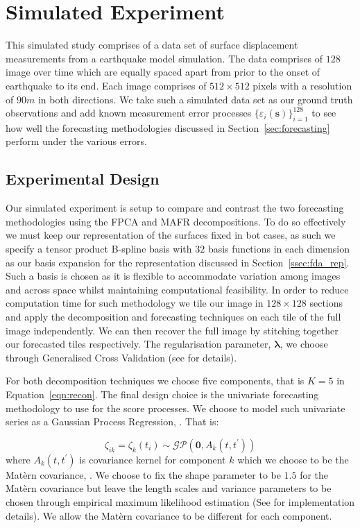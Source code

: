 \documentclass{article}
\newcommand{\ve}[1]{\bm{{#1}}}
\begin{document}
\section{\label{sec:sim_exp}Simulated Experiment}
This simulated study comprises of a data set of surface displacement measurements from a earthquake model simulation. The data comprises of $128$ image over time which are equally spaced apart from prior to the onset of earthquake to its end. Each image comprises of $512 \times 512$ pixels with a resolution of $90m$ in both directions. We take such a simulated data set as our ground truth observations and add known measurement error processes $\{\varepsilon_i\left( \ve{s} \right)\}_{i=1}^{128}$ to see how well the forecasting methodologies discussed in Section~\ref{sec:forecasting} perform under the various errors. 
\subsection{\label{ssec:sim_exp_design}Experimental Design}
Our simulated experiment is setup to compare and contrast the two forecasting methodologies using the FPCA and MAFR decompositions. To do so effectively we must keep our representation of the surfaces fixed in bot cases, as such we specify a tensor product B-spline basis with $32$ basis functions in each dimension as our basis expansion for the representation discussed in Section~\ref{ssec:fda_rep}. Such a basis is chosen as it is flexible to accommodate variation among images and across space whilst maintaining computational feasibility. In order to reduce computation time for such methodology we tile our image in $128 \times 128$ sections and apply the decomposition and forecasting techniques on each tile of the full image independently. We can then recover the full image by stitching together our forecasted tiles respectively. The regularisation parameter, $\ve{\lambda}$, we choose through Generalised Cross Validation (see \citet{lukas_robust_2006} for details). 

For both decomposition techniques we choose five components, that is $K=5$ in Equation~\ref{eqn:recon}. The final design choice is the univariate forecasting methodology to use for the score processes. We choose to model such univariate series as a Gaussian Process Regression, \cite{williams_gaussian_2006}. That is:

\begin{equation}
  \zeta_{ik} = \zeta_k\left( t_i \right) \sim \mathcal{GP}\left( \ve{0}, A_k\left( t, t^\prime \right) \right)
  \label{eqn:score_proc}
\end{equation}
where $A_k\left( t, t^\prime \right)$ is covariance kernel for component $k$ which we choose to be the Mat\`{e}rn covariance,  \cite{abramowitz_handbook_2013}. We choose to fix the shape parameter to be $1.5$ for the Mat\`{e}rn covariance but leave the length scales and variance parameters to be chosen through empirical maximum likelihood estimation (See \citet{williams_gaussian_2006} for implementation details). We allow the Mat\`{e}rn covariance to be different for each component.
\end{document}
